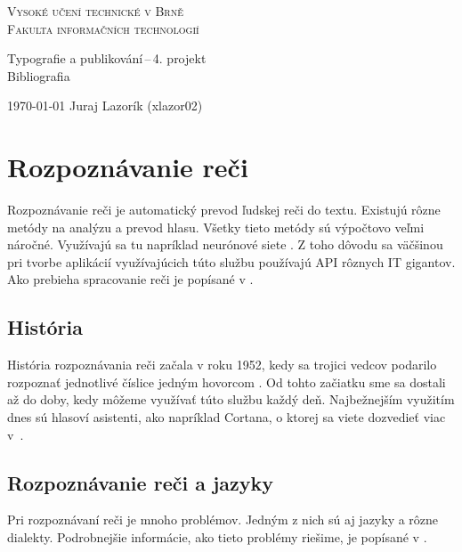 \documentclass[a4paper, 11pt, hidelinks]{article}
\begin{document}
\renewcommand{\refname}{Literatúra}

\begin{titlepage}

\begin{center}

\Huge\textsc{Vysoké učení technické v Brně} \\
\huge\textsc{Fakulta informačních technologií} \\	


\LARGE Typografie a publikování\,--\,4. projekt \\
\Huge Bibliografia

\end{center}

{\LARGE \today \hfill
Juraj Lazorík (xlazor02)}

\end{titlepage}

\section{Rozpoznávanie reči}
Rozpoznávanie reči je automatický prevod ľudskej reči do textu. Existujú rôzne metódy na analýzu a prevod hlasu. Všetky tieto metódy sú výpočtovo veľmi náročné. Využívajú sa tu napríklad neurónové siete \cite{rekurentNeuronSiet}. Z toho dôvodu sa väčšinou pri tvorbe aplikácií využívajúcich túto službu používajú API rôznych IT gigantov. Ako prebieha spracovanie reči je popísané v \cite{LouizouPhiliposC2007}.

\subsection{História}
História rozpoznávania reči začala v roku 1952, kedy sa trojici vedcov podarilo rozpoznať jednotlivé číslice jedným hovorcom \cite{wikiRozpozReci}. Od tohto začiatku sme sa dostali až do doby, kedy môžeme využívať túto službu každý deň. Najbežnejším využitím dnes sú hlasoví asistenti, ako napríklad Cortana, o ktorej sa viete dozvedieť viac v~\cite{wikiCortana}.

\subsection{Rozpoznávanie reči a jazyky}
Pri rozpoznávaní reči je mnoho problémov. Jedným z nich sú aj jazyky a rôzne dialekty. Podrobnejšie informácie, ako tieto problémy riešime, je popísané v \cite{rozpozRecVybraneJazyky}.
\end{document}
